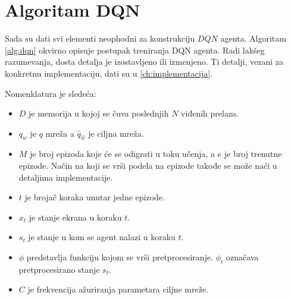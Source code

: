 \section{Algoritam DQN}

Sada su dati svi elementi neophodni za konstrukciju $DQN$ agenta. Algoritam \ref{alg:dqn} okvirno opisuje postupak treniranja DQN agenta. Radi lakšeg razumevanja, dosta detalja je izostavljeno ili izmenjeno. Ti detalji, vezani za konkretnu implementaciju, dati su u \ref{ch:implementacija}. 
\par 
Nomenklatura je sledeća:
\begin{itemize}
	\item $D$ je memorija u kojoj se čuva poslednjih $N$ viđenih prelaza.
	\item $q_w$ je $q$ mreža a $\hat{q}_{\hat{w}}$ je ciljna mreža.
	\item $M$ je broj epizoda koje će se odigrati u toku učenja, a $e$ je broj trenutne epizode. Način na koji se vrši podela na epizode takođe se može naći u detaljima implementacije. 
	\item $t$ je brojač koraka unutar jedne epizode.
	\item $x_t$ je stanje ekrana u koraku $t$.
	\item $s_t$ je stanje u kom se agent nalazi u koraku $t$.
	\item $\phi$ predstavlja funkciju kojom se vrši pretprocesiranje. $\phi_t$ označava pretprocesirano stanje $s_t$.
	\item $C$ je frekvencija ažuriranja parametara ciljne mreže.
\end{itemize}

